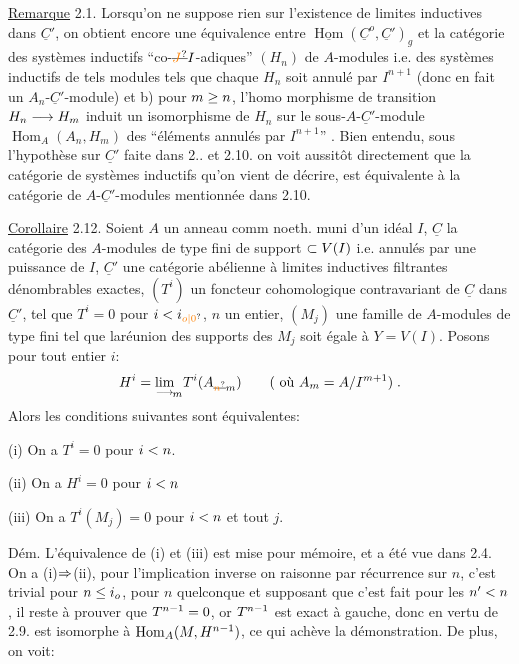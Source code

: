 \uline{Remarque} 2.1. Lorsqu'on ne suppose rien sur l'existence de limites
inductives dans $\underline C'$, on obtient encore une équivalence entre $\underline{\operatorname{Hom}}(\underline C^o,\underline C')_g$
et la catégorie des systèmes inductifs ``co-$\deleted{\unsure{J}}\handwritten{I}$-adiques'' $(H_n)$ de $A$-modules
i.e. des systèmes inductifs de tels modules tels que  chaque $H_n$ soit
annulé par $I^{n+1}$ (donc en fait un $A_n$-$\underline C'$-module) et b) pour $m\geq n$, l'homo%
%
morphisme de transition $H_n\longrightarrow H_m$ induit un isomorphisme de $H_n$ sur le
sous-$A$-$\underline C'$-module $\operatorname{Hom}_A(A_n,H_m)$ des ``éléments annulés par $I^{n+1}$'' . Bien
entendu, sous l'hypothèse sur $\underline C'$ faite dans 2.. et 2.10. on voit aussitôt directement que la catégorie de systèmes inductifs qu'on vient de
décrire, est équivalente à  la catégorie de $A$-$\underline C'$-modules mentionnée dans 2.10.

\uline{Corollaire} 2.12. Soient $A$ un anneau comm noeth. muni d'un idéal $I$,
$\underline C$ la catégorie des $A$-modules de type fini de support $\subset V(I)$ i.e. annulés
par une puissance de $I$, $\underline C'$ une catégorie abélienne à limites inductives
filtrantes dénombrables exactes, $(T^i)$ un foncteur cohomologique
contravariant de $\underline C$ dans $\underline C'$, tel que $T^i=0$ pour $i\handwritten{<}i_{\unsure{o|0}}$, $n$ un entier,
$(M_j)$ une famille de $A$-modules de type fini tel que laréunion des
supports des $M_j$ soit égale à $Y=V(I)$.  Posons pour tout entier $i$:
\[
H^i=\underset{\handwritten{\longrightarrow}}{\lim}_{\!m}T^i(A_{\deleted{\unsure{n}}\handwritten{m}})\qquad(\text{ où }A_m=A/I^{m+1})\;.
\]
Alors les conditions suivantes sont équivalentes:

(i) On a $T^i=0$ pour $i<n$.

(ii) On a $H^i=0$ pour $i<n$

(iii) On a $T^i(M_j)=0$ pour $i<n$ et tout $j$.

Dém. L'équivalence de (i) et (iii) est mise pour mémoire, et a été
vue dans 2.4. On a (i)$\Rightarrow$(ii), pour l'implication inverse on
raisonne par récurrence sur $n$, c'est trivial pour $n\leq i_o$, pour $n$ quelconque
et supposant que c'est fait pour les $n'<n$, il reste à prouver que $T^{n-1}=0$,
or $T^{n-1}$ est exact à gauche, donc en vertu de 2.9. est isomorphe à
$\operatorname{Hom}_A(M,H^{n-1})$,  ce qui achève la démonstration. De plus, on voit:

